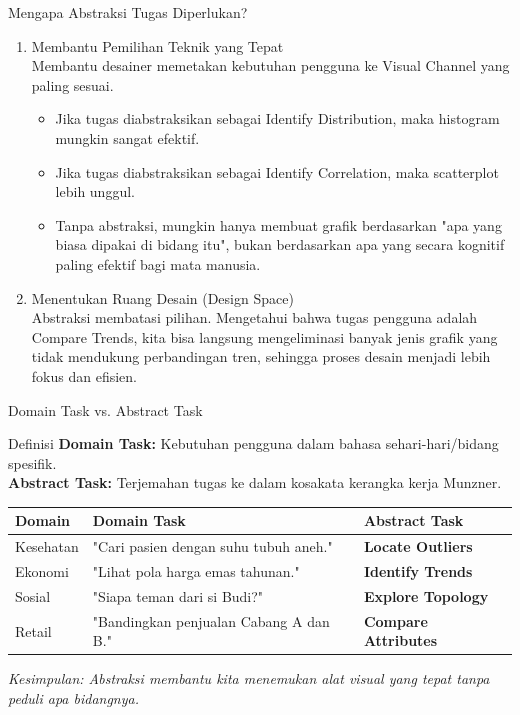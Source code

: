 \documentclass[t]{beamer}
\begin{document}
\begin{frame}{Mengapa Abstraksi Tugas Diperlukan?}
	\begin{enumerate}
		\item Membantu Pemilihan Teknik yang Tepat \\
		Membantu desainer memetakan kebutuhan pengguna ke Visual Channel yang paling sesuai. 
		\begin{itemize}
			\item Jika tugas diabstraksikan sebagai Identify Distribution, maka histogram mungkin sangat efektif.
			\item Jika tugas diabstraksikan sebagai Identify Correlation, maka scatterplot lebih unggul.
			\item Tanpa abstraksi, mungkin hanya membuat grafik berdasarkan "apa yang biasa dipakai di bidang itu", bukan berdasarkan apa yang secara kognitif paling efektif bagi mata manusia.
		\end{itemize}
		\item Menentukan Ruang Desain (Design Space) \\
		Abstraksi membatasi pilihan. Mengetahui bahwa tugas pengguna adalah Compare Trends, kita bisa langsung mengeliminasi banyak jenis grafik yang tidak mendukung perbandingan tren, sehingga proses desain menjadi lebih fokus dan efisien.
	\end{enumerate}
\end{frame}

\begin{frame}{Domain Task vs. Abstract Task}
    \begin{block}{Definisi}
        \textbf{Domain Task:} Kebutuhan pengguna dalam bahasa sehari-hari/bidang spesifik. \\
        \textbf{Abstract Task:} Terjemahan tugas ke dalam kosakata kerangka kerja Munzner.
    \end{block}

    \vspace{0.3cm}
    \centering
    \small
    \begin{tabular}{lp{4cm}p{4cm}}
        \toprule
        \textbf{Domain} & \textbf{Domain Task} & \textbf{Abstract Task} \\ \midrule
        Kesehatan & "Cari pasien dengan suhu tubuh aneh." & \textbf{Locate Outliers} \\ \addlinespace
        Ekonomi & "Lihat pola harga emas tahunan." & \textbf{Identify Trends} \\ \addlinespace
        Sosial & "Siapa teman dari si Budi?" & \textbf{Explore Topology} \\ \addlinespace
        Retail & "Bandingkan penjualan Cabang A dan B." & \textbf{Compare Attributes} \\ \bottomrule
    \end{tabular}
    
    \vspace{0.4cm}
    \textit{Kesimpulan: Abstraksi membantu kita menemukan alat visual yang tepat tanpa peduli apa bidangnya.}
\end{frame}
\end{document}
